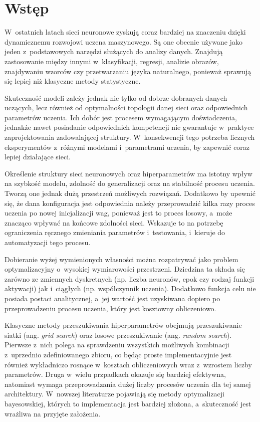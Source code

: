 \chapter{Wstęp}
\label{chap:intro}
W~ostatnich latach sieci neuronowe
zyskują coraz bardziej na znaczeniu
dzięki dynamicznemu rozwojowi uczena maszynowego.
Są one obecnie używane jako jeden z~podstawowych
narzędzi służących do analizy danych.
Znajdują zastosowanie między innymi w~klasyfikacji,
regresji, analizie obrazów, znajdywaniu wzorców
czy przetwarzaniu języka naturalnego,
ponieważ sprawują się lepiej
niż klasyczne metody statystyczne.

Skuteczność modeli zależy jednak nie tylko
od dobrze dobranych danych uczących,
lecz również od optymalności topologii danej sieci
oraz odpowiednich parametrów uczenia.
Ich dobór jest procesem wymagającym doświadczenia,
jednakże nawet posiadanie odpowiednich
kompetencji nie gwarantuje w~praktyce
zaprojektowania zadowalającej struktury.
W~konsekwencji tego potrzeba licznych eksperymentów
z~różnymi modelami i~parametrami uczenia,
by zapewnić coraz lepiej działające sieci.

Określenie struktury sieci neuronowych
oraz hiperparametrów ma istotny wpływ
na szybkość modelu, zdolność do generalizacji
oraz na stabilność procesu uczenia.
Tworzą one jednak dużą przestrzeń możliwych rozwiązań.
Dodatkowo by upewnić się, że dana konfiguracja
jest odpowiednia należy przeprowadzić kilka razy
proces uczenia po nowej inicjalizacji wag,
ponieważ jest to proces losowy,
a~może znacząco wpływać na końcowe zdolności sieci.
Wskazuje to na potrzebę ograniczenia ręcznego
zmieniania parametrów i~testowania,
i~kieruje do automatyzacji tego procesu.

Dobieranie wyżej wymienionych własności można
rozpatrywać jako problem optymalizacyjny
o~wysokiej wymiarowości przestrzeni.
Dziedzina ta składa się zarówno ze zmiennych dyskretnych
(np. liczba neuronów, epok czy rodzaj funkcji aktywacji)
jak i~ciągłych (np. współczynnik uczenia).
Dodatkowo funkcja celu nie posiada postaci analitycznej,
a~jej wartość jest uzyskiwana dopiero
po przeprowadzeniu procesu uczenia,
który jest kosztowny obliczeniowo.

Klasyczne metody przeszukiwania
hiperparametrów obejmują przeszukiwanie
siatki (ang. \textit{grid search})
oraz losowe przeszukiwanie
(ang. \textit{random search}).
Pierwsze z~nich polega na sprawdzeniu wszystkich
możliwych kombinacji z~uprzednio zdefiniowanego zbioru,
co będąc proste implementacyjnie jest również
wykładniczo rosnące w~kosztach obliczeniowych
wraz z~wzrostem liczby parametrów.
Druga w~wielu przpadkach okazuje się bardziej efektywna,
natomiast wymaga przeprowadzania dużej liczby
procesów uczenia dla tej samej architektury.
W~nowszej literaturze pojawiają się
metody optymalizacji bayesowskiej,
których to implementacja jest bardziej złożona,
a~skuteczność jest wrażliwa na przyjęte założenia.

